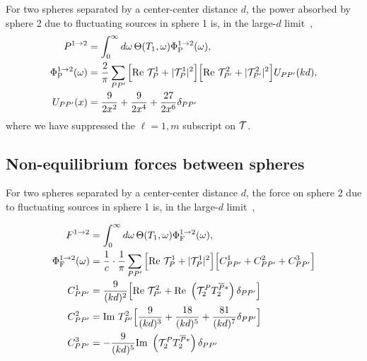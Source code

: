 \documentclass[letterpaper]{article}
\begin{document}
For two spheres separated by a center-center distance
$d$, the power absorbed by sphere 2 due to fluctuating
sources in sphere 1 is, in the large-$d$ limit~\cite{Kruger2012},
\begin{align*}
 P^{1\to 2} 
&= 
 \int_0^\infty d\omega \, \Theta(T_1,\omega) \Phi_{\text{\scriptsize P}}^{1\to 2}(\omega),
\\
 \Phi_{\text{\scriptsize P}}^{1\to 2}(\omega) 
&= 
 \frac{2}{\pi}\sum_{P P^\prime}
 \Big[ \text{Re }\mathcal{T}^1_{P} + |\mathcal{T}^1_{P}|^2\Big]
 \Big[ \text{Re }\mathcal{T}^2_{P^\prime} + |\mathcal{T}^2_{P^\prime}|^2\Big]
 U_{PP^\prime}(kd),
\\
 U_{PP^\prime}(x)
 &=\frac{9}{2x^2} + \frac{9}{2x^4} + \frac{27}{2x^6}\delta_{PP^\prime}
\end{align*}
where we have suppressed the $\ell=1, m$ subscript on
$\mathcal{T}$.

\subsection{Non-equilibrium forces between spheres}

For two spheres separated by a center-center distance
$d$, the force on sphere 2 due to fluctuating
sources in sphere 1 is, in the large-$d$ limit~\cite{Kruger2012},

\begin{align*}
 F^{1\to 2}
&=
 \int_0^\infty d\omega \, \Theta(T_1,\omega) \Phi_{\text{\scriptsize F}}^{1\to 2}(\omega),
\\
 \Phi_{\text{\scriptsize F}}^{1\to 2}(\omega)
&= \frac{1}{c}
   \cdot
   \frac{1}{\pi}\sum_{P P^\prime}
   \Big[ \text{Re }\mathcal{T}^1_P + |\mathcal{T}^1_P|^2\Big]
   \Big[ C^1_{PP^\prime} + C^2_{PP^\prime} + C^3_{PP^\prime} \Big]
\\
 C^1_{PP^\prime}
 &=\frac{9}{(kd)^2}
   \Big[ \text{Re }\mathcal{T}^2_{P^\prime} + 
         \text{Re }\left(\mathcal{T}_2^P T_2^{\overline{P}*}\right)\delta_{PP^\prime}
   \Big]
\\
 C^2_{PP^\prime}
 &=\text{Im }T^2_{P^\prime}
   \Big[ \frac{9}{(kd)^3} + \frac{18}{(kd)^5} + \frac{81}{(kd)^7}\delta_{PP^\prime}\Big]
\\
 C^3_{PP^\prime}
 &=-\frac{9}{(kd)^5}
    \text{Im }\left(\mathcal{T}_2^P T_2^{\overline{P}*}\right)\delta_{PP^\prime}
\end{align*}
\end{document}
